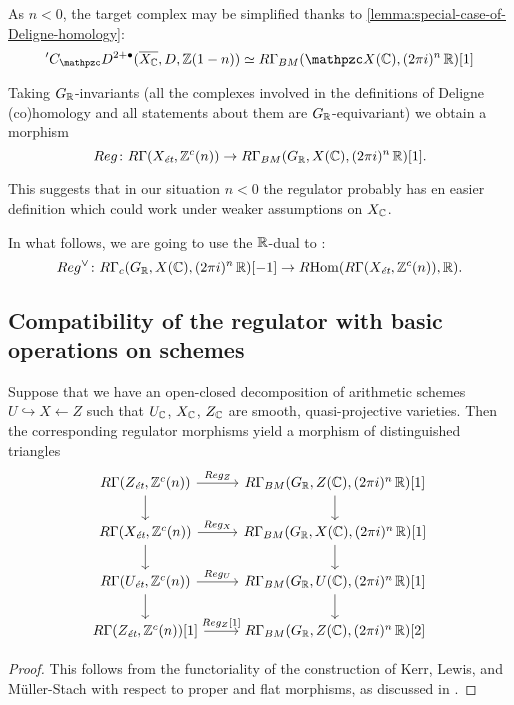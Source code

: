 As $n < 0$, the target complex may be simplified thanks to
\ref{lemma:special-case-of-Deligne-homology}:
\[ {}' C_\mathcal{D}^{2 + \bullet} (\overline{X_\CC}, D, \ZZ (1-n)) \quiso
  R\Gamma_{BM} (\mathcal{X} (\CC), (2\pi i)^n\,\RR) [1] \]

Taking $G_{\mathbb{R}}$-invariants (all the complexes involved in the definitions of
Deligne (co)homology and all statements about them are $G_{\mathbb{R}}$-equivariant) we
obtain a morphism
\begin{equation}
  \label{eqn:regulator-morphism}
  Reg\colon R\Gamma (X_\text{\it ét}, \mathbb{Z}^c (n)) \to
  R\Gamma_{BM} (G_{\mathbb{R}}, X (\mathbb{C}), (2\pi i)^n\,\mathbb{R}) [1].
\end{equation}

\begin{remark}
  This suggests that in our situation $n < 0$ the regulator probably has en
  easier definition which could work under weaker assumptions on $X_{\mathbb{C}}$.
\end{remark}

In what follows, we are going to use the $\mathbb{R}$-dual to
:
\begin{equation}
  \label{eqn:dual-to-the-regulator}
  Reg^\vee\colon R\Gamma_c (G_{\mathbb{R}}, X (\mathbb{C}), (2\pi i)^n\,\mathbb{R}) [-1] \to
  R\!\operatorname{Hom} (R\Gamma (X_\text{\it ét}, \mathbb{Z}^c (n)), \mathbb{R}).
\end{equation}

\subsection*{Compatibility of the regulator with basic operations on schemes}

\begin{lemma}
  \label{lemma:Reg-compatible-with-open-closed-decompositions}
  Suppose that we have an open-closed decomposition of arithmetic schemes
  $U \hookrightarrow X \leftarrow Z$ such that $U_{\mathbb{C}}$, $X_{\mathbb{C}}$, $Z_{\mathbb{C}}$ are
  smooth, quasi-projective varieties. Then the corresponding regulator morphisms
  yield a morphism of distinguished triangles
  \[ \begin{tikzcd}
      R\Gamma (Z_\text{\it ét}, \ZZ^c (n)) \ar{d} \ar{r}{Reg_Z} & R\Gamma_{BM} (G_\RR, Z (\CC), (2\pi i)^n\,\RR) [1] \ar{d} \\
      R\Gamma (X_\text{\it ét}, \ZZ^c (n)) \ar{d} \ar{r}{Reg_X} & R\Gamma_{BM} (G_\RR, X (\CC), (2\pi i)^n\,\RR) [1] \ar{d} \\
      R\Gamma (U_\text{\it ét}, \ZZ^c (n)) \ar{d} \ar{r}{Reg_U} & R\Gamma_{BM} (G_\RR, U (\CC), (2\pi i)^n\,\RR) [1] \ar{d} \\
      R\Gamma (Z_\text{\it ét}, \ZZ^c (n)) [1] \ar{r}{Reg_Z [1]} & R\Gamma_{BM} (G_\RR, Z (\CC), (2\pi i)^n\,\RR) [2]
    \end{tikzcd} \]

  \begin{proof}
    This follows from the functoriality of the construction of Kerr, Lewis, and
    Müller-Stach with respect to proper and flat morphisms, as discussed in
    \cite[\S 3]{Weissschuh-17}.
  \end{proof}
\end{lemma}

